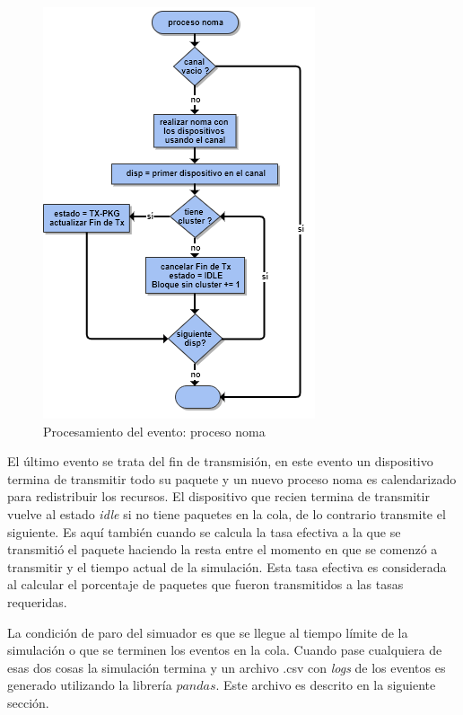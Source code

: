 \begin{figure}[th]
    \centering
    \includegraphics[scale=1]{Figures/flownoma.png}
    \decoRule
    \caption[Procesamiento del evento: proceso noma]{Procesamiento del evento: proceso noma}
    \label{fig:flownoma}
\end{figure}

El último evento se trata del fin de transmisión, en este evento un dispositivo termina de transmitir todo su paquete y un nuevo proceso noma es calendarizado para redistribuir los recursos. El dispositivo que recien termina de transmitir vuelve al estado \textit{idle} si no tiene paquetes en la cola, de lo contrario transmite el siguiente. Es aquí también cuando se calcula la tasa efectiva a la que se transmitió el paquete haciendo la resta entre el momento en que se comenzó a transmitir y el tiempo actual de la simulación. Esta tasa efectiva es considerada al calcular el porcentaje de paquetes que fueron transmitidos a las tasas requeridas.\newline

La condición de paro del simuador es que se llegue al tiempo límite de la simulación o que se terminen los eventos en la cola. Cuando pase cualquiera de esas dos cosas la simulación termina y un archivo .csv con \textit{logs} de los eventos es generado utilizando la librería $pandas$. Este archivo es descrito en la siguiente sección. \newline


